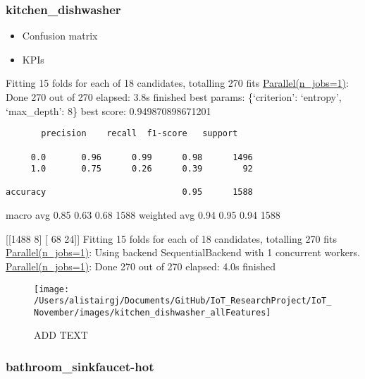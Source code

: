 \documentclass[11pt,]{article}
\providecommand{\tightlist}{%
  \setlength{\itemsep}{0pt}\setlength{\parskip}{0pt}}
\begin{document}
\pagebreak

\hypertarget{kitchen_dishwasher}{%
\subsubsection{kitchen\_dishwasher}\label{kitchen_dishwasher}}

\begin{itemize}
\tightlist
\item
  Confusion matrix
\item
  KPIs
\end{itemize}

Fitting 15 folds for each of 18 candidates, totalling 270 fits
\href{Done\%20270\%20out\%20of\%20270\%20\%7C\%20elapsed:\%202.1s\%20finished}{Parallel(n\_jobs=1)}:
Done 270 out of 270 \textbar{} elapsed: 3.8s finished best params:
\{`criterion': `entropy', `max\_depth': 8\} best score:
0.949870898671201

\begin{verbatim}
       precision    recall  f1-score   support

     0.0       0.96      0.99      0.98      1496
     1.0       0.75      0.26      0.39        92

accuracy                           0.95      1588
\end{verbatim}

macro avg 0.85 0.63 0.68 1588 weighted avg 0.94 0.95 0.94 1588

{[}{[}1488 8{]} {[} 68 24{]}{]} Fitting 15 folds for each of 18
candidates, totalling 270 fits
\href{Done\%20270\%20out\%20of\%20270\%20\%7C\%20elapsed:\%202.1s\%20finished}{Parallel(n\_jobs=1)}:
Using backend SequentialBackend with 1 concurrent workers.
\href{Done\%20270\%20out\%20of\%20270\%20\%7C\%20elapsed:\%202.1s\%20finished}{Parallel(n\_jobs=1)}:
Done 270 out of 270 \textbar{} elapsed: 4.0s finished

\begin{figure}[H]

{\centering \texttt{[image: /Users/alistairgj/Documents/GitHub/IoT\_ResearchProject/IoT\_November/images/kitchen\_dishwasher\_allFeatures]} 

}

\caption{ADD TEXT}\label{fig:unnamed-chunk-20}
\end{figure}

\pagebreak

\hypertarget{bathroom_sinkfaucet-hot}{%
\subsubsection{bathroom\_sinkfaucet-hot}\label{bathroom_sinkfaucet-hot}}
\end{document}

